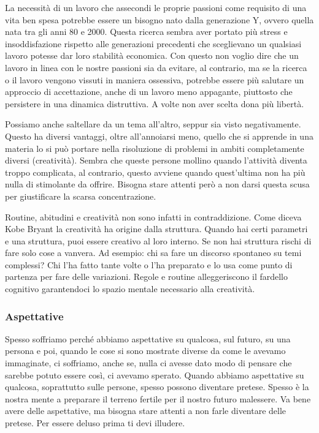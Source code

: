\documentclass[12pt]{book} %
\begin{document}
\begin{mdframed}[linewidth=1pt]
La necessità di un lavoro che assecondi le proprie passioni come requisito di una vita ben spesa potrebbe essere un bisogno nato dalla
generazione Y, ovvero quella nata tra gli anni 80 e 2000. Questa ricerca sembra aver portato più stress e
insoddisfazione rispetto alle generazioni precedenti che sceglievano un qualsiasi lavoro potesse dar loro stabilità
economica. Con questo non voglio dire che un lavoro in linea con le nostre passioni sia da evitare, al contrario, ma se la ricerca o il lavoro vengono vissuti in maniera ossessiva, potrebbe essere più salutare un approccio di accettazione, anche di un lavoro meno appagante, piuttosto che persistere in una dinamica distruttiva. A volte non aver scelta dona più libertà.

Possiamo anche saltellare da un tema all'altro, seppur sia visto negativamente. Questo ha diversi vantaggi, oltre all'annoiarsi meno, quello che si apprende in una materia lo si può portare nella risoluzione di problemi in ambiti completamente diversi (creatività). Sembra che queste persone mollino quando l'attività diventa troppo complicata, al contrario, questo avviene quando quest'ultima non ha più nulla di stimolante da offrire. Bisogna stare attenti però a non darsi questa scusa per giustificare la scarsa concentrazione.

Routine, abitudini e creatività non sono infatti in contraddizione. Come diceva Kobe Bryant la creatività ha origine dalla struttura. Quando hai certi parametri e una struttura, puoi essere creativo al loro interno. Se non hai struttura rischi di fare solo cose a vanvera. Ad esempio: chi sa fare un discorso spontaneo su temi complessi? Chi l'ha fatto tante volte o l'ha preparato e lo usa come punto di partenza per fare delle variazioni. Regole e routine alleggeriscono il fardello cognitivo garantendoci lo spazio mentale necessario alla creatività.
\end{mdframed}

\subsubsection{Aspettative}
Spesso soffriamo perché abbiamo aspettative su qualcosa, sul futuro, su una persona e poi, quando le cose si sono mostrate diverse da come le avevamo
immaginate, ci soffriamo, anche se, nulla ci avesse dato modo di pensare che sarebbe potuto essere così, ci avevamo
sperato. Quando abbiamo aspettative su qualcosa, soprattutto sulle persone, spesso possono diventare pretese. Spesso
è la nostra mente a preparare il terreno fertile per il nostro futuro malessere.
Va bene avere delle aspettative, ma bisogna stare attenti a non farle diventare delle pretese. 
Per essere deluso prima ti devi illudere.
\end{document}

